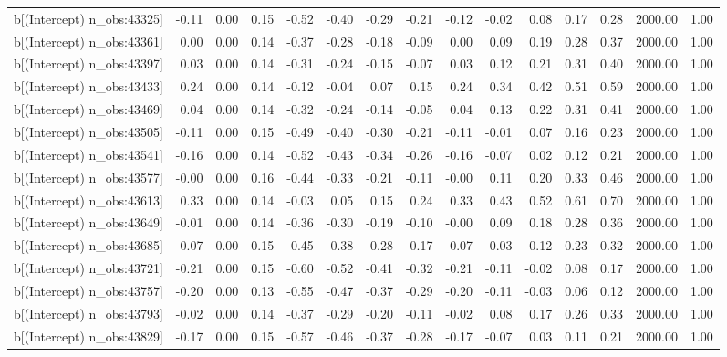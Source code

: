 \begin{table}[ht]
\begin{tabular}{rrrrrrrrrrrrrrr}
  b[(Intercept) n\_obs:43325] & -0.11 & 0.00 & 0.15 & -0.52 & -0.40 & -0.29 & -0.21 & -0.12 & -0.02 & 0.08 & 0.17 & 0.28 & 2000.00 & 1.00 \\ 
  b[(Intercept) n\_obs:43361] & 0.00 & 0.00 & 0.14 & -0.37 & -0.28 & -0.18 & -0.09 & 0.00 & 0.09 & 0.19 & 0.28 & 0.37 & 2000.00 & 1.00 \\ 
  b[(Intercept) n\_obs:43397] & 0.03 & 0.00 & 0.14 & -0.31 & -0.24 & -0.15 & -0.07 & 0.03 & 0.12 & 0.21 & 0.31 & 0.40 & 2000.00 & 1.00 \\ 
  b[(Intercept) n\_obs:43433] & 0.24 & 0.00 & 0.14 & -0.12 & -0.04 & 0.07 & 0.15 & 0.24 & 0.34 & 0.42 & 0.51 & 0.59 & 2000.00 & 1.00 \\ 
  b[(Intercept) n\_obs:43469] & 0.04 & 0.00 & 0.14 & -0.32 & -0.24 & -0.14 & -0.05 & 0.04 & 0.13 & 0.22 & 0.31 & 0.41 & 2000.00 & 1.00 \\ 
  b[(Intercept) n\_obs:43505] & -0.11 & 0.00 & 0.15 & -0.49 & -0.40 & -0.30 & -0.21 & -0.11 & -0.01 & 0.07 & 0.16 & 0.23 & 2000.00 & 1.00 \\ 
  b[(Intercept) n\_obs:43541] & -0.16 & 0.00 & 0.14 & -0.52 & -0.43 & -0.34 & -0.26 & -0.16 & -0.07 & 0.02 & 0.12 & 0.21 & 2000.00 & 1.00 \\ 
  b[(Intercept) n\_obs:43577] & -0.00 & 0.00 & 0.16 & -0.44 & -0.33 & -0.21 & -0.11 & -0.00 & 0.11 & 0.20 & 0.33 & 0.46 & 2000.00 & 1.00 \\ 
  b[(Intercept) n\_obs:43613] & 0.33 & 0.00 & 0.14 & -0.03 & 0.05 & 0.15 & 0.24 & 0.33 & 0.43 & 0.52 & 0.61 & 0.70 & 2000.00 & 1.00 \\ 
  b[(Intercept) n\_obs:43649] & -0.01 & 0.00 & 0.14 & -0.36 & -0.30 & -0.19 & -0.10 & -0.00 & 0.09 & 0.18 & 0.28 & 0.36 & 2000.00 & 1.00 \\ 
  b[(Intercept) n\_obs:43685] & -0.07 & 0.00 & 0.15 & -0.45 & -0.38 & -0.28 & -0.17 & -0.07 & 0.03 & 0.12 & 0.23 & 0.32 & 2000.00 & 1.00 \\ 
  b[(Intercept) n\_obs:43721] & -0.21 & 0.00 & 0.15 & -0.60 & -0.52 & -0.41 & -0.32 & -0.21 & -0.11 & -0.02 & 0.08 & 0.17 & 2000.00 & 1.00 \\ 
  b[(Intercept) n\_obs:43757] & -0.20 & 0.00 & 0.13 & -0.55 & -0.47 & -0.37 & -0.29 & -0.20 & -0.11 & -0.03 & 0.06 & 0.12 & 2000.00 & 1.00 \\ 
  b[(Intercept) n\_obs:43793] & -0.02 & 0.00 & 0.14 & -0.37 & -0.29 & -0.20 & -0.11 & -0.02 & 0.08 & 0.17 & 0.26 & 0.33 & 2000.00 & 1.00 \\ 
  b[(Intercept) n\_obs:43829] & -0.17 & 0.00 & 0.15 & -0.57 & -0.46 & -0.37 & -0.28 & -0.17 & -0.07 & 0.03 & 0.11 & 0.21 & 2000.00 & 1.00 \\ 

\end{tabular}
\end{table}
